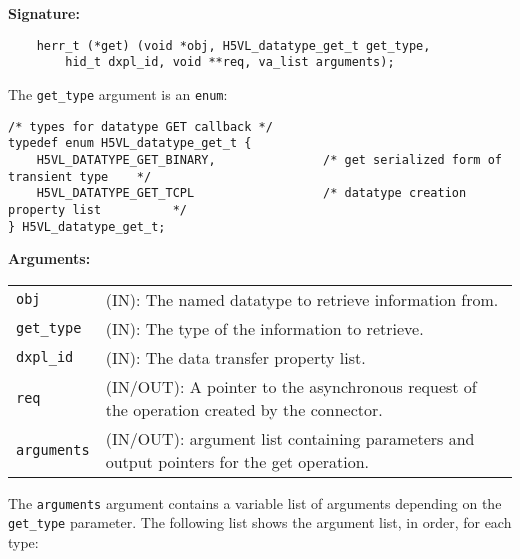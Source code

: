 \begin{mdframed}[style=bgbox]
\textbf{Signature:}
\begin{lstlisting}
    herr_t (*get) (void *obj, H5VL_datatype_get_t get_type, 
        hid_t dxpl_id, void **req, va_list arguments);
\end{lstlisting}

The \texttt{get\_type} argument is an \texttt{enum}:
\begin{lstlisting}
/* types for datatype GET callback */
typedef enum H5VL_datatype_get_t {                                               
    H5VL_DATATYPE_GET_BINARY,               /* get serialized form of transient type    */
    H5VL_DATATYPE_GET_TCPL                  /* datatype creation property list          */
} H5VL_datatype_get_t; 
\end{lstlisting}

\textbf{Arguments:}\\
\begin{tabular}{l p{13.5cm}}
  \texttt{obj} & (IN): The named datatype to retrieve information from.\\
  \texttt{get\_type} & (IN): The type of the information to retrieve.\\
  \texttt{dxpl\_id} & (IN): The data transfer property list.\\
  \texttt{req} & (IN/OUT): A pointer to the asynchronous request of the
  operation created by the connector.\\
  \texttt{arguments} & (IN/OUT): argument list containing parameters and
  output pointers for the get operation. \\
\end{tabular}
\end{mdframed}

The \texttt{arguments} argument contains a variable list of arguments
depending on the \texttt{get\_type} parameter. The following list shows
the argument list, in order, for each type:

